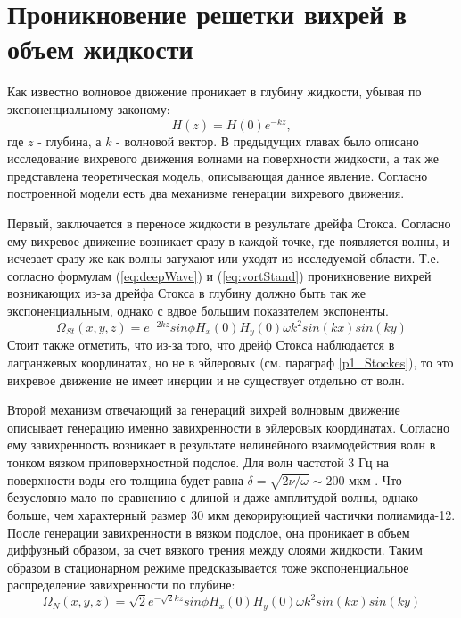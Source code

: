 \chapter{Проникновение решетки вихрей в объем жидкости} \label{chapt6}

Как известно \cite{land} волновое движение проникает в глубину жидкости, убывая по экспоненциальному законому:
\begin{equation}
 \label{eq:deepWave}
H(z) = H(0) e^{-kz},
\end{equation}
 где $z$ - глубина, а $k$ - волновой вектор. 
 В предыдущих главах было описано исследование вихревого движения волнами на поверхности жидкости, а так же представлена теоретическая модель, описывающая данное явление.
Согласно построенной модели есть два механизме генерации вихревого движения. 

	Первый, заключается в переносе жидкости в результате дрейфа Стокса. Согласно ему вихревое движение возникает сразу в каждой точке, где появляется волны, и исчезает сразу же как волны затухают или уходят из исследуемой области. Т.е. согласно формулам (\ref{eq:deepWave}) и (\ref{eq:vortStand}) проникновение вихрей возникающих из-за дрейфа Стокса в глубину должно быть так же экспоненциальным, однако с вдвое большим показателем экспоненты.
\begin{equation}
 \label{eq:deepStocks}
\Omega_{St}(x,y,z)  = e^{-2kz} sin \phi H_x(0) H_y(0) \omega k^2 sin(kx)sin(ky)
\end{equation}
Стоит также отметить, что из-за того, что дрейф Стокса наблюдается в лагранжевых координатах, но не в эйлеровых (см. параграф \ref{p1_Stockes}), то это вихревое движение не имеет инерции и не существует отдельно от волн.

	Второй механизм отвечающий за генераций вихрей волновым движение описывает генерацию именно завихренности в эйлеровых координатах. Согласно ему завихренность возникает в результате нелинейного взаимодействия волн в тонком вязком приповерхностной подслое. Для волн частотой 3 Гц на поверхности воды его толщина будет равна $\delta = \sqrt{2 \nu / \omega} \sim 200 $ мкм  \cite{FalkovichBook}. Что безусловно мало по сравнению с длиной и даже амплитудой волны, однако больше, чем характерный размер 30 мкм декорирующией частички полиамида-12. После генерации завихренности в вязком подслое, она проникает в объем диффузный образом, за счет вязкого трения между слоями жидкости. Таким образом в стационарном режиме предсказывается тоже экспоненциальное распределение завихренности по глубине:
\begin{equation}
 \label{eq:deepEyler}
\Omega_N(x,y,z)  = \sqrt{2}e^{-\sqrt{2}kz} sin \phi H_x(0) H_y(0) \omega k^2 sin(kx)sin(ky)
\end{equation}

